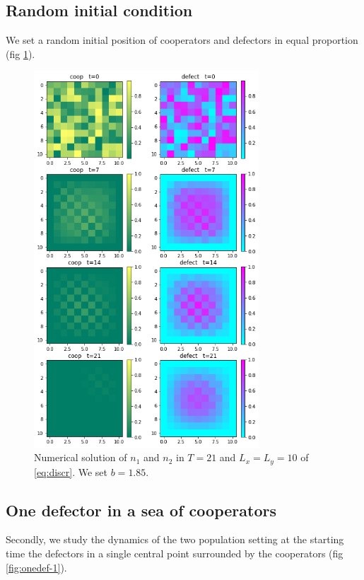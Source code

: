 \subsection{Random initial condition}

We set a random initial position of cooperators and defectors in equal
proportion (fig \ref{fig:rand-1}). 

\begin{figure}
\includegraphics[width=0.75\textwidth]{immagini/discr-rand}

\caption{\label{fig:rand-1}Numerical solution of $n_{1}$ and $n_{2}$ in
$T=21$ and $L_{x}=L_{y}=10$ of \ref{eq:discr}. We set $b=1.85$.}
\end{figure}


\subsection{One defector in a sea of cooperators}

Secondly, we study the dynamics of the two population setting at the
starting time the defectors in a single central point surrounded by
the cooperators (fig \ref{fig:onedef-1}). 

